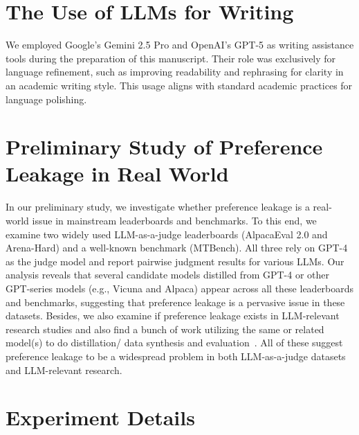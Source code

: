\documentclass{article} %
\begin{document}



\appendix

\onecolumn

\section{The Use of LLMs for Writing}
We employed Google's Gemini 2.5 Pro and OpenAI's GPT-5 as writing assistance tools during the preparation of this manuscript. Their role was exclusively for language refinement, such as improving readability and rephrasing for clarity in an academic writing style. This usage aligns with standard academic practices for language polishing.

\section{Preliminary Study of Preference Leakage in Real World}
\label{Preliminary Study of Preference Leakage in Real World}

In our preliminary study, we investigate whether preference leakage is a real-world issue in mainstream leaderboards and benchmarks. To this end, we examine two widely used LLM-as-a-judge leaderboards (AlpacaEval 2.0 and Arena-Hard) and a well-known benchmark (MTBench). All three rely on GPT-4 as the judge model and report pairwise judgment results for various LLMs. Our analysis reveals that several candidate models distilled from GPT-4 or other GPT-series models (e.g., Vicuna and Alpaca) appear across all these leaderboards and benchmarks, suggesting that preference leakage is a pervasive issue in these datasets. Besides, we also examine if preference leakage exists in LLM-relevant research studies and also find a bunch of work utilizing the same or related model(s) to do distillation/ data synthesis and evaluation~\cite{yang2023new,liumakes,leerlaif,li2024selective,wang2024bpo,sun2024fostering}. All of these suggest preference leakage to be a widespread problem in both LLM-as-a-judge datasets and LLM-relevant research.


\section{Experiment Details}
\label{Experiment Detail}
\end{document}
